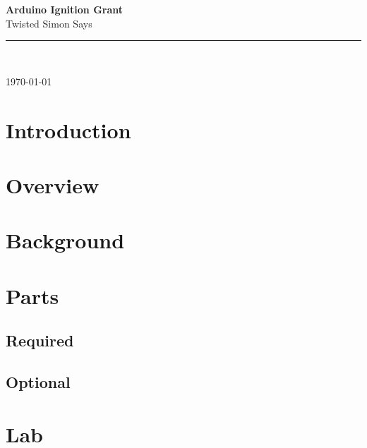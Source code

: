 \documentclass[12pt,letterpaper,oneside]{article}
\newcommand{\HRule}{\rule{\linewidth}{0.5mm}}
\begin{document}
\begin{titlepage}
\vspace*{\fill}
\begin{center}
	
{\huge \bfseries Arduino Ignition Grant} \\[0.4cm]
Twisted Simon Says
\HRule \\[0.4cm]

\begin{minipage}{0.4\textwidth}
\end{minipage}

\vspace*{\fill}

{\large \today}
\end{center}
\end{titlepage}

\doublespace
\tableofcontents %
\newpage
\listoftables %
\newpage
\lstlistoflistings %
\newpage
\singlespace
{} %
			
\section{Introduction}

\section{Overview}

\section{Background}
\section{Parts}
		\subsection{Required}
		\subsection{Optional}
\section{Lab}
\end{document}
